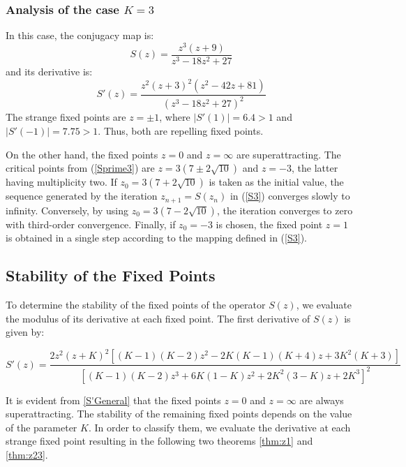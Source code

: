 \documentclass{article}
\theoremstyle{definition}
\theoremstyle{remark}
\begin{document}
\subsubsection{Analysis of the case $K=3$}
In this case, the conjugacy map is:
\begin{equation}\label{S3}
	S(z)=\frac{z^3(z+9)}{z^3-18z^2+27}
\end{equation}
and its derivative is:
\begin{equation}\label{Sprime3}
	S'(z)=\frac{z^2(z+3)^2(z^2-42z+81)}{\left(z^3-18z^2+27\right)^2}
\end{equation}
The strange fixed points are $z=\pm 1$, where $|S'(1)| = 6.4 > 1$ and $|S'(-1)| = 7.75 > 1$. Thus, both are repelling fixed points.

On the other hand, the fixed points $z=0$ and $z=\infty$ are superattracting. The critical points from (\ref{Sprime3}) are $z=3(7\pm 2\sqrt{10})$ and $z=-3$, the latter having multiplicity two. If $z_0=3(7+ 2\sqrt{10})$ is taken as the initial value, the sequence generated by the iteration $z_{n+1}=S(z_n)$ in (\ref{S3}) converges slowly to infinity. Conversely, by using $z_0=3(7- 2\sqrt{10})$, the iteration converges to zero with third-order convergence. Finally, if $z_0=-3$ is chosen, the fixed point $z=1$ is obtained in a single step according to the mapping defined in (\ref{S3}).



\subsection{Stability of the Fixed Points}

To determine the stability of the fixed points of the operator \( S(z) \), we evaluate the modulus of its derivative at each fixed point. The first derivative of \( S(z) \) is given by:

\begin{equation}\label{S'General}
	S'(z)=\frac{2z^2(z+K)^2\left[(K-1)(K-2)z^2-2K(K-1)(K+4)z+3K^2(K+3)\right]}{\left[(K-1)(K-2)z^3+6K(1-K)z^2+2K^2(3-K)z+2K^3\right]^2}
\end{equation}

It is evident from \eqref{S'General} that the fixed points \( z = 0 \) and \( z = \infty \) are always superattracting.
The stability of the remaining fixed points depends on the value of the parameter \( K \). In order to classify them, we evaluate the derivative at each strange fixed point resulting in the following two theorems \ref{thm:z1} and \ref{thm:z23}.
\end{document}
